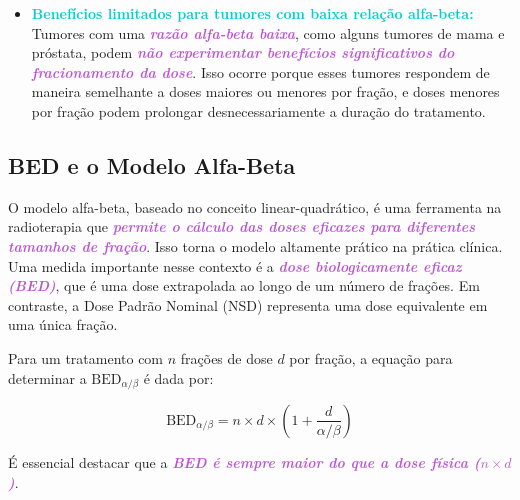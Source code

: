 \documentclass[11pt,a4paper]{article}
\begin{document}
\begin{itemize}
		\item \textcolor{DarkTurquoise}{\textbf{Benefícios limitados para tumores com baixa relação alfa-beta:}} Tumores com uma \textcolor{MediumOrchid}{\textbf{\textit{razão alfa-beta baixa}}}, como alguns tumores de mama e próstata, podem \textcolor{MediumOrchid}{\textbf{\textit{não experimentar benefícios significativos do fracionamento da dose}}}. Isso ocorre porque esses tumores respondem de maneira semelhante a doses maiores ou menores por fração, e doses menores por fração podem prolongar desnecessariamente a duração do tratamento.
	\end{itemize}

\subsection*{BED e o Modelo Alfa-Beta}

	O modelo alfa-beta, baseado no conceito linear-quadrático, é uma ferramenta na radioterapia que \textcolor{MediumOrchid}{\textbf{\textit{permite o cálculo das doses eficazes para diferentes tamanhos de fração}}}. Isso torna o modelo altamente prático na prática clínica. Uma medida importante nesse contexto é a \textcolor{MediumOrchid}{\textbf{\textit{dose biologicamente eficaz (BED)}}}, que é uma dose extrapolada ao longo de um número de frações. Em contraste, a Dose Padrão Nominal (NSD) representa uma dose equivalente em uma única fração.

	Para um tratamento com $n$ frações de dose $d$ por fração, a equação para determinar a $\text{BED}_{\alpha/\beta}$ é dada por:

	\begin{equation}
		\text{BED}_{\alpha/\beta} = n \times d \times \left(1 + \frac{d}{\alpha/\beta}\right)
	\end{equation}

	É essencial destacar que a \textcolor{MediumOrchid}{\textbf{\textit{BED é sempre maior do que a dose física ($n \times d$)}}}.
	
	\
\end{document}

